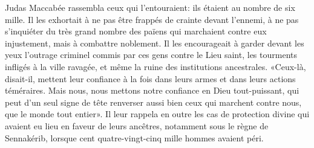 Judas Maccabée rassembla ceux qui l’entouraient: ils étaient au nombre de six mille.
Il les exhortait à ne pas être frappés de crainte devant l’ennemi,
	à ne pas s’inquiéter du très grand nombre des païens
		qui marchaient contre eux injustement,
	mais à combattre noblement.
Il les encourageait à garder devant les yeux
		l’outrage criminel commis par ces gens contre le Lieu saint,
	les tourments infligés à la ville ravagée,
	et même la ruine des institutions ancestrales.
«Ceux-là, disait-il, mettent leur confiance
		à la fois dans leurs armes et dans leurs actions téméraires.
	Mais nous, nous mettons notre confiance en Dieu tout-puissant,
	qui peut d’un seul signe de tête
	renverser aussi bien ceux qui marchent contre nous, que le monde tout entier».
Il leur rappela en outre les cas de protection divine
		qui avaient eu lieu en faveur de leurs ancêtres,
	notamment sous le règne de Sennakérib,
	lorsque cent quatre-vingt-cinq mille hommes avaient péri.
